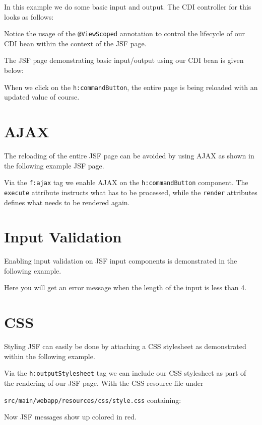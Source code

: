 In this example we do some basic input and output.
The CDI controller for this looks as follows:

Notice the usage of the \texttt{@ViewScoped} annotation to control the lifecycle of our CDI bean within the context of the JSF page.

The JSF page demonstrating basic input/output using our CDI bean is given below:

When we click on the \texttt{h:commandButton}, the entire page is being reloaded with an updated value of course.


\section{AJAX}

The reloading of the entire JSF page can be avoided by using AJAX as shown in the following example JSF page.

Via the \texttt{f:ajax} tag we enable AJAX on the \texttt{h:commandButton} component.
The \texttt{execute} attribute instructs what has to be processed, while the \texttt{render} attributes defines what needs to be rendered again.


\section{Input Validation}

Enabling input validation on JSF input components is demonstrated in the following example.

Here you will get an error message when the length of the input is less than 4.

\section{CSS}

Styling JSF can easily be done by attaching a CSS stylesheet as demonstrated within the following example.

Via the \texttt{h:outputStylesheet} tag we can include our CSS stylesheet as part of the rendering of our JSF page.
With the CSS resource file under

\texttt{src/main/webapp/resources/css/style.css} containing:

Now JSF messages show up colored in red.

